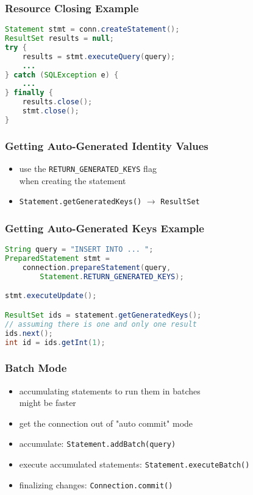\documentclass[dvipsnames]{beamer}
\theoremstyle{plain}
\begin{document}
\begin{frame}[fragile]
  \frametitle{Resource Closing Example}

  \begin{block}{}
    \begin{lstlisting}[language=Java]
Statement stmt = conn.createStatement();
ResultSet results = null;
try {
    results = stmt.executeQuery(query);
    ...
} catch (SQLException e) {
    ...
} finally {
    results.close();
    stmt.close();
}
    \end{lstlisting}
  \end{block}
\end{frame}

\begin{frame}
  \frametitle{Getting Auto-Generated Identity Values}

  \begin{itemize}
    \item use the \lstinline!RETURN_GENERATED_KEYS! flag\\
      when creating the statement
    \item \lstinline!Statement.getGeneratedKeys()! $\rightarrow$
      \lstinline!ResultSet!
  \end{itemize}
\end{frame}

\begin{frame}[fragile]
  \frametitle{Getting Auto-Generated Keys Example}

  \begin{block}{}
    \begin{lstlisting}[language=Java]
String query = "INSERT INTO ... ";
PreparedStatement stmt =
    connection.prepareStatement(query,
        Statement.RETURN_GENERATED_KEYS);

stmt.executeUpdate();

ResultSet ids = statement.getGeneratedKeys();
// assuming there is one and only one result
ids.next();
int id = ids.getInt(1);
    \end{lstlisting}
  \end{block}
\end{frame}

\begin{frame}
  \frametitle{Batch Mode}

  \begin{itemize}
    \item accumulating statements to run them in batches\\
      might be faster

    \pause
    \medskip
    \item get the connection out of "auto commit" mode
    \item accumulate: \lstinline!Statement.addBatch(query)!
    \item execute accumulated statements: \lstinline!Statement.executeBatch()!
    \item finalizing changes: \lstinline!Connection.commit()!
  \end{itemize}
\end{frame}
\end{document}
